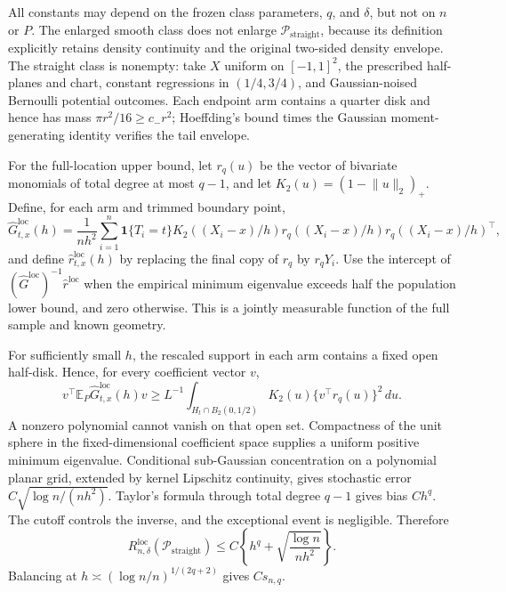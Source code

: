 All constants may depend on the frozen class parameters, \(q\), and \(\delta\), but not on \(n\) or \(P\).  The enlarged smooth class does not enlarge \(\mathcal P_{\mathrm{straight}}\), because its definition explicitly retains density continuity and the original two-sided density envelope.  The straight class is nonempty: take \(X\) uniform on \([-1,1]^2\), the prescribed half-planes and chart, constant regressions in \((1/4,3/4)\), and Gaussian-noised Bernoulli potential outcomes.  Each endpoint arm contains a quarter disk and hence has mass \(\pi r^2/16\geq c_-r^2\); Hoeffding's bound times the Gaussian moment-generating identity verifies the tail envelope.

For the full-location upper bound, let \(r_q(u)\) be the vector of bivariate monomials of total degree at most \(q-1\), and let \(K_2(u)=(1-\lVert u\rVert_2)_+\).  Define, for each arm and trimmed boundary point,
\[
 \widehat G^{\mathrm{loc}}_{t,x}(h)=\frac1{nh^2}\sum_{i=1}^n
 \mathbf1\{T_i=t\}K_2((X_i-x)/h)
 r_q((X_i-x)/h)r_q((X_i-x)/h)^\top,
\]
and define \(\widehat r^{\mathrm{loc}}_{t,x}(h)\) by replacing the final copy of \(r_q\) by \(r_qY_i\).  Use the intercept of \((\widehat G^{\mathrm{loc}})^{-1}\widehat r^{\mathrm{loc}}\) when the empirical minimum eigenvalue exceeds half the population lower bound, and zero otherwise.  This is a jointly measurable function of the full sample and known geometry.

For sufficiently small \(h\), the rescaled support in each arm contains a fixed open half-disk.  Hence, for every coefficient vector \(v\),
\[
 v^\top\mathbb E_P\widehat G^{\mathrm{loc}}_{t,x}(h)v
 \geq L^{-1}\int_{H_t\cap B_2(0,1/2)}K_2(u)
 \{v^\top r_q(u)\}^2\,du.
\]
A nonzero polynomial cannot vanish on that open set.  Compactness of the unit sphere in the fixed-dimensional coefficient space supplies a uniform positive minimum eigenvalue.  Conditional sub-Gaussian concentration on a polynomial planar grid, extended by kernel Lipschitz continuity, gives stochastic error \(C\sqrt{\log n/(nh^2)}\).  Taylor's formula through total degree \(q-1\) gives bias \(Ch^q\).  The cutoff controls the inverse, and the exceptional event is negligible.  Therefore
\[
 R_{n,\delta}^{\mathrm{loc}}(\mathcal P_{\mathrm{straight}})
 \leq C\left\{h^q+\sqrt{\frac{\log n}{nh^2}}\right\}.
\]
Balancing at \(h\asymp(\log n/n)^{1/(2q+2)}\) gives \(Cs_{n,q}\).

